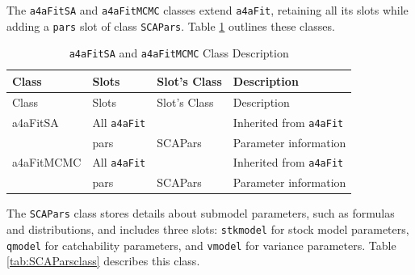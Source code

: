 \documentclass[
]{book}
\begin{document}
The \texttt{a4aFitSA} and \texttt{a4aFitMCMC} classes extend \texttt{a4aFit}, retaining all its slots while adding a \texttt{pars} slot of class \texttt{SCAPars}. Table \ref{tab:a4afitSAclass} outlines these classes.

\begin{longtable}[]{@{}llll@{}}
\caption{\label{tab:a4afitSAclass} \texttt{a4aFitSA} and \texttt{a4aFitMCMC} Class Description}\tabularnewline
\toprule\noalign{}
Class & Slots & Slot's Class & Description \\
\midrule\noalign{}
\endfirsthead
\toprule\noalign{}
Class & Slots & Slot's Class & Description \\
\midrule\noalign{}
\endhead
\bottomrule\noalign{}
\endlastfoot
a4aFitSA & All \texttt{a4aFit} & & Inherited from \texttt{a4aFit} \\
& pars & SCAPars & Parameter information \\
a4aFitMCMC & All \texttt{a4aFit} & & Inherited from \texttt{a4aFit} \\
& pars & SCAPars & Parameter information \\
\end{longtable}

The \texttt{SCAPars} class stores details about submodel parameters, such as formulas and distributions, and includes three slots: \texttt{stkmodel} for stock model parameters, \texttt{qmodel} for catchability parameters, and \texttt{vmodel} for variance parameters. Table \ref{tab:SCAParsclass} describes this class.
\end{document}
